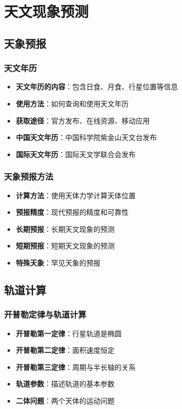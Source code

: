 \documentclass[12pt,UTF8]{ctexbook}
\begin{document}
\part{天文现象预测}

\chapter{天象预报}
\section{天文年历}

\begin{itemize}
  \item \textbf{天文年历的内容}：包含日食、月食、行星位置等信息
  \item \textbf{使用方法}：如何查询和使用天文年历
  \item \textbf{获取途径}：官方发布、在线资源、移动应用
  \item \textbf{中国天文年历}：中国科学院紫金山天文台发布
  \item \textbf{国际天文年历}：国际天文学联合会发布
\end{itemize}

\section{天象预报方法}

\begin{itemize}
  \item \textbf{计算方法}：使用天体力学计算天体位置
  \item \textbf{预报精度}：现代预报的精度和可靠性
  \item \textbf{长期预报}：长期天文现象的预测
  \item \textbf{短期预报}：短期天文现象的预测
  \item \textbf{特殊天象}：罕见天象的预报
\end{itemize}

\chapter{轨道计算}
\section{开普勒定律与轨道计算}

\begin{itemize}
  \item \textbf{开普勒第一定律}：行星轨道是椭圆
  \item \textbf{开普勒第二定律}：面积速度恒定
  \item \textbf{开普勒第三定律}：周期与半长轴的关系
  \item \textbf{轨道参数}：描述轨道的基本参数
  \item \textbf{二体问题}：两个天体的运动问题
\end{itemize}
\end{document}
